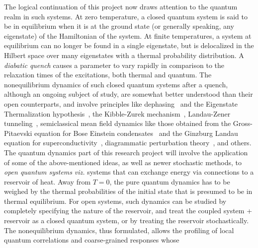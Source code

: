 \documentclass[a4paper,11pt,color]{article}
\begin{document}
The logical continuation of this project now draws attention to the quantum realm in such systems. At zero temperature, a closed quantum system is said to be in equilibrium when it is at the ground state (or generally speaking, any eigenstate) of the Hamiltonian of the system. At finite temperatures, a system at equilibrium can no longer be found in a single eigenstate, but is delocalized in the Hilbert space over many eigenstates with a thermal probability distribution. A \textit{diabatic quench} causes a  {parameter} to vary rapidly in comparison to the relaxation times of the excitations, both thermal and quantum. The nonequilibrium dynamics of such closed quantum systems after a quench, although an ongoing subject of study,  {are somewhat better understood than their open counterparts}, and involve principles like dephasing~\cite{thermalization} 
and the Eigenstate Thermalization hypothesis~\cite{thermalization,krishrev}, the Kibble-Zurek mechanism~\cite{bikashbabu}, Landau-Zener tunneling~\cite{bikashbabu}, semiclassical mean field dynamics like those obtained from the Gross-Pitaevski equation for Bose Einstein condensates~\cite{colrev} and the Ginzburg Landau equation for superconductivity~\cite{rammer}, diagrammatic perturbation theory~\cite{gorkov, volkov}, and others. The quantum dynamics part of this research project will involve the application of some of the above-mentioned ideas, as well as newer stochastic methods, to \textit{open quantum systems} \textit{viz.} systems that can exchange energy via connections to a reservoir of heat. Away from $T=0$, the pure quantum dynamics has to be weighed by the thermal probabilities of the initial state that is presumed to be in thermal equilibrium. For open systems, such dynamics can be studied by completely specifying the nature of the reservoir, and treat the coupled system + reservoir as a closed 
quantum system, or by treating the reservoir stochastically. The nonequilibrium dynamics, thus formulated, allows the profiling of local quantum correlations and coarse-grained responses whose 
\end{document}
